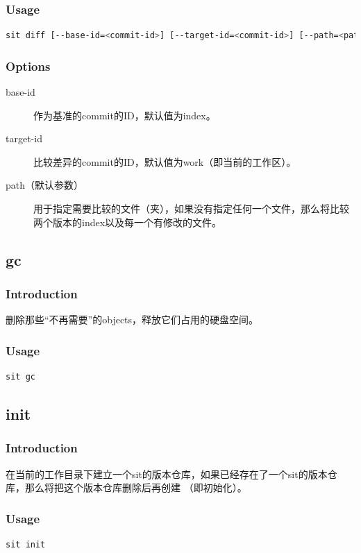 \documentclass[11pt, a4paper, UTF8]{ctexart}
\begin{document}
\subsubsection*{Usage}
\begin{lstlisting}[language=sh,basicstyle=\small\YaHeiMono,numbers=none]
sit diff [--base-id=<commit-id>] [--target-id=<commit-id>] [--path=<path> ...]
\end{lstlisting}
\subsubsection*{Options}
\begin{description}
	\item[\YaHeiMono base-id] 作为基准的commit的ID，默认值为index。
	\item[\YaHeiMono target-id] 比较差异的commit的ID，默认值为work（即当前的工作区）。
	\item[\YaHeiMono path（默认参数）] 用于指定需要比较的文件（夹），如果没有指定任何一个文件，那么将比较两个版本的index以及每一个有修改的文件。
\end{description}

\subsection{gc}
\subsubsection*{Introduction}
删除那些``不再需要''的objects，释放它们占用的硬盘空间。
\subsubsection*{Usage}
\begin{lstlisting}[language=sh,basicstyle=\small\YaHeiMono,numbers=none]
sit gc
\end{lstlisting}

\subsection{init}
\subsubsection*{Introduction}
在当前的工作目录下建立一个sit的版本仓库，如果已经存在了一个sit的版本仓库，那么将把这个版本仓库删除后再创建
（即初始化）。
\subsubsection*{Usage}
\begin{lstlisting}[language=sh,basicstyle=\small\YaHeiMono,numbers=none]
sit init
\end{lstlisting}
\end{document}
